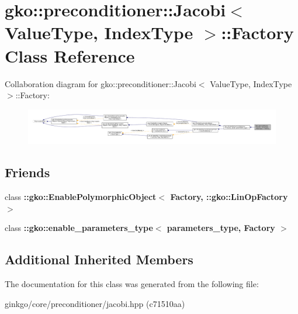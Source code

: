 \hypertarget{classgko_1_1preconditioner_1_1Jacobi_1_1Factory}{}\section{gko\+:\+:preconditioner\+:\+:Jacobi$<$ Value\+Type, Index\+Type $>$\+:\+:Factory Class Reference}
\label{classgko_1_1preconditioner_1_1Jacobi_1_1Factory}


Collaboration diagram for gko\+:\+:preconditioner\+:\+:Jacobi$<$ Value\+Type, Index\+Type $>$\+:\+:Factory\+:
\nopagebreak
\begin{figure}[H]
\begin{center}
\leavevmode
\includegraphics[width=350pt]{classgko_1_1preconditioner_1_1Jacobi_1_1Factory__coll__graph}
\end{center}
\end{figure}
\subsection*{Friends}
\begin{DoxyCompactItemize}
\item 
\mbox{\label{classgko_1_1preconditioner_1_1Jacobi_1_1Factory_a27e9bbc94a1c1c59f40833153eda8f78}} 
class {\bfseries \+::gko\+::\+Enable\+Polymorphic\+Object$<$ Factory, \+::gko\+::\+Lin\+Op\+Factory $>$}
\item 
\mbox{\label{classgko_1_1preconditioner_1_1Jacobi_1_1Factory_a0d176cbd42d6214e11aee8c30ca256fc}} 
class {\bfseries \+::gko\+::enable\+\_\+parameters\+\_\+type$<$ parameters\+\_\+type, Factory $>$}
\end{DoxyCompactItemize}
\subsection*{Additional Inherited Members}


The documentation for this class was generated from the following file\+:\begin{DoxyCompactItemize}
\item 
ginkgo/core/preconditioner/jacobi.\+hpp (c71510aa)\end{DoxyCompactItemize}
